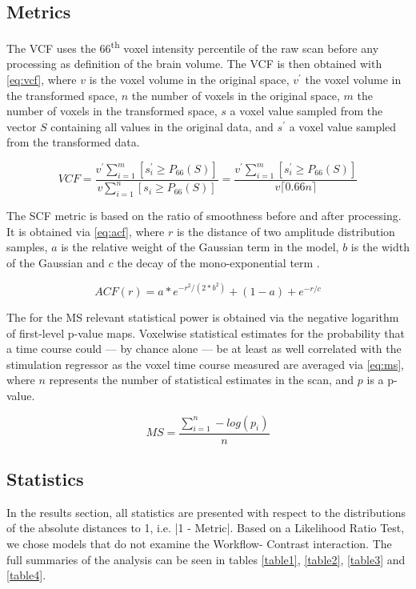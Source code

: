 \subsection{Metrics}

The VCF uses the 66\textsuperscript{th} voxel intensity percentile of the raw scan before any processing as definition of the brain volume.
The VCF is then obtained with \cref{eq:vcf}, where $v$ is the voxel volume in the original space, $v^\prime$ the voxel volume in the transformed space, $n$ the number of voxels in the original space, $m$ the number of voxels in the transformed space, $s$ a voxel value sampled from the vector $S$ containing all values in the original data, and $s^\prime$ a voxel value sampled from the transformed data.

\begin{equation} \label{eq:vcf}
        V\!C\!F
        = \frac{v^\prime\sum_{i=1}^m [s^\prime_i \geq P_{66}(S)]}{v\sum_{i=1}^n [s_i \geq P_{66}(S)]}
        = \frac{v^\prime\sum_{i=1}^m [s^\prime_i \geq P_{66}(S)]}{v \lceil0.66n\rceil}
\end{equation}

The SCF metric is based on the ratio of smoothness before and after processing.
It is obtained via \cref{eq:acf}, where $r$ is the distance of two amplitude distribution samples, $a$ is the relative weight of the Gaussian term in the model, $b$ is the width of the Gaussian and $c$ the decay of the mono-exponential term \cite{cox2017fmri}.

\begin{equation} \label{eq:acf}
        ACF(r)
        = a * e^{ -r^{2}/ (2 * b^{2}) } + (1 - a) + e^{-r/c}
\end{equation}

The for the MS relevant statistical power is obtained via the negative logarithm of first-level p-value maps.
Voxelwise statistical estimates for the probability that a time course could --- by chance alone --- be at least as well correlated with the stimulation regressor as the voxel time course measured are averaged via \cref{eq:ms}, where $n$ represents the number of statistical estimates in the scan, and $p$ is a p-value.

\begin{equation} \label{eq:ms}
        M\!S = \frac{\sum_{i=1}^n -log(p_i)}{n}
\end{equation}

\subsection{Statistics}

In the results section, all statistics are presented with respect to the distributions of the absolute distances to 1, i.e. |1 - Metric|.
Based on a Likelihood Ratio Test, we chose models that do not examine the Workflow- Contrast interaction.
The full summaries of the analysis can be seen in tables \cref{table1}, \cref{table2}, \cref{table3} and \cref{table4}.